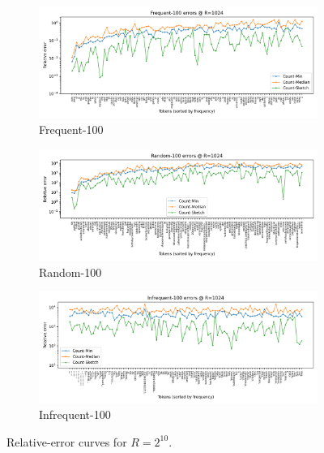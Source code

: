 \documentclass[11pt]{article}
\begin{document}
\begin{figure}[H]
  \centering
  \begin{subfigure}[t]{0.32\linewidth}
    \centering
    \includegraphics[width=\linewidth]{../outputs/a2/errors_R1024_Frequent_100.png}
    \caption{Frequent-100}
  \end{subfigure}
  \hfill
  \begin{subfigure}[t]{0.32\linewidth}
    \centering
    \includegraphics[width=\linewidth]{../outputs/a2/errors_R1024_Random_100.png}
    \caption{Random-100}
  \end{subfigure}
  \hfill
  \begin{subfigure}[t]{0.32\linewidth}
    \centering
    \includegraphics[width=\linewidth]{../outputs/a2/errors_R1024_Infrequent_100.png}
    \caption{Infrequent-100}
  \end{subfigure}
  \caption{Relative-error curves for $R=2^{10}$.}
  \label{fig:error-r1024}
\end{figure}
\end{document}
